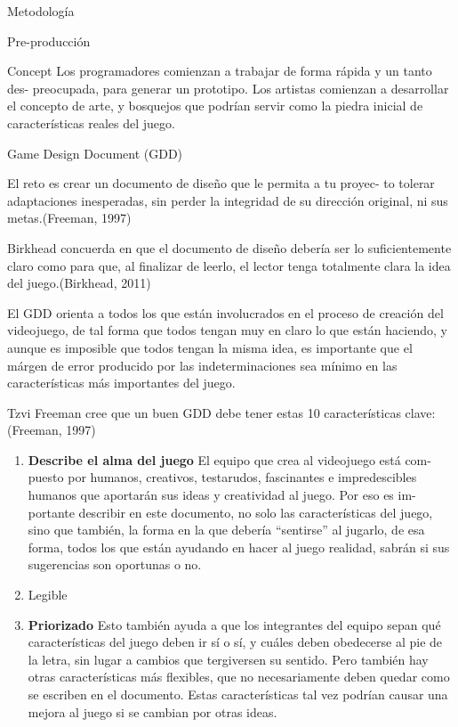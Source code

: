 \begin{section}{Metodología}
\begin{subsection}{Pre-producción}
\begin{subsubsection}{Concept}
      Los programadores comienzan a trabajar de forma rápida y un tanto des- preocupada, para generar un prototipo. Los artistas comienzan a desarrollar el concepto de arte, y bosquejos que podrían servir como la piedra inicial de características reales del juego.
    \end{subsubsection}

    \begin{subsubsection}{Game Design Document (GDD)}
      \begin{citation}
        El reto es crear un documento de diseño que le permita a tu proyec- to tolerar adaptaciones inesperadas, sin perder la integridad de su dirección original, ni sus metas.(Freeman, 1997)
      \end{citation}

      Birkhead concuerda en que el documento de diseño debería ser lo suficientemente claro como para que, al finalizar de leerlo, el lector tenga totalmente clara la idea del juego.(Birkhead, 2011)

      El GDD orienta a todos los que están involucrados en el proceso de creación del videojuego, de tal forma que todos tengan muy en claro lo que están haciendo, y aunque es imposible que todos tengan la misma idea, es importante que el márgen de error producido por las indeterminaciones sea mínimo en las características más importantes del juego.

      Tzvi Freeman cree que un buen GDD debe tener estas 10 características clave: (Freeman, 1997)

      \begin{enumerate}
      \item \textbf{Describe el alma del juego} El equipo que crea al videojuego está com- puesto por humanos, creativos, testarudos, fascinantes e impredescibles humanos que aportarán sus ideas y creatividad al juego. Por eso es im- portante describir en este documento, no solo las características del juego, sino que también, la forma en la que debería ``sentirse'' al jugarlo, de esa forma, todos los que están ayudando en hacer al juego realidad, sabrán si sus sugerencias son oportunas o no.
      \item Legible
      \item \textbf{Priorizado} Esto también ayuda a que los integrantes del equipo sepan qué características del juego deben ir sí o sí, y cuáles deben obedecerse al pie de la letra, sin lugar a cambios que tergiversen su sentido. Pero también hay otras características más flexibles, que no necesariamente deben quedar como se escriben en el documento. Estas características tal vez podrían causar una mejora al juego si se cambian por otras ideas.


\end{enumerate}
\end{subsubsection}
\end{subsection}
\end{section}
